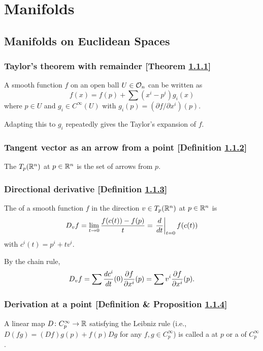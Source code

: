 \section{Manifolds\cite{loring}}
\subsection{Manifolds on Euclidean Spaces}
\subsubsection{Taylor's theorem with remainder [Theorem \ref{taylors-theorem-with-remainder}]}\label{taylors-theorem-with-remainder}
A smooth function $f$ on an open ball $U \in \mathcal{O}_{n}$ can be written as
\[
f(x) = f(p) + \sum (x^i - p^i) g_i(x)
\]
where $p \in U$ and $g_i \in C^\infty (U)$ with $g_i(p) = (\partial f / \partial x^i)(p)$.

Adapting this to $g_i$ repeatedly gives the Taylor's expansion of $f$.

\subsubsection{Tangent vector as an arrow from a point [Definition \ref{tangent-vector-as-an-arrow-from-a-point}]}\label{tangent-vector-as-an-arrow-from-a-point}
The  $T_p (\mathbb{R}^n)$ at $p \in \mathbb{R}^n$ is the set of arrows from $p$.

\subsubsection{Directional derivative [Definition \ref{directional-derivative}]}\label{directional-derivative}
The  of a smooth function $f$ in the direction $v \in T_p(\mathbb{R}^n)$ at $p \in \mathbb{R}^n$ is
\[
D_v f = \lim_{t \to 0} \fr{f(c(t)) - f(p)}{t} = \left. \fr{d}{dt}\right|_{t=0} f(c(t))
\]
with $c^i(t) = p^i + tv^i$.

By the chain rule,
\[
D_v f = \sum \fr{dc^i}{dt}(0)\pfr{f}{x^i}(p) = \sum v^i \pfr{f}{x^i}(p).
\]

\subsubsection{Derivation at a point [Definition \& Proposition \ref{derivation-at-a-point}]}\label{derivation-at-a-point}
A linear map $D \colon C_p^\infty \to \mathbb{R}$ satisfying the Leibniz rule (i.e., $D(fg) = (D f)g(p) + f(p)D g$ for any $f, g \in C_p^\infty$) is called a  at $p$ or a  of $C_p^\infty$.

